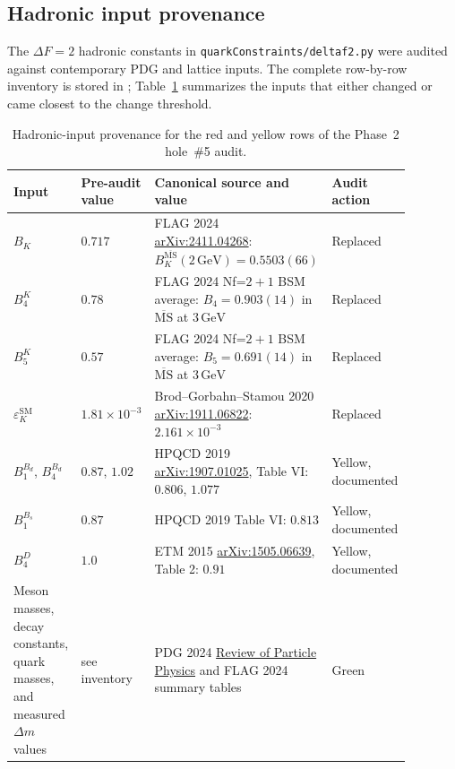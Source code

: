 \documentclass[11pt]{article}
\newcommand{\msbar}{\overline{\mathrm{MS}}}
\newcommand{\eK}{\varepsilon_K}
\begin{document}
\subsection{Hadronic input provenance}
\label{app:hadronic-input-provenance}

The $\Delta F=2$ hadronic constants in
\texttt{quarkConstraints/deltaf2.py} were audited against contemporary
PDG and lattice inputs. The complete row-by-row inventory is stored in
; Table~\ref{tab:hadronic-provenance}
summarizes the inputs that either changed or came closest to the
change threshold.

\begin{table}[h]
  \centering
  \scriptsize
  \setlength{\tabcolsep}{3pt}
  \begin{tabular}{p{0.17\linewidth}p{0.16\linewidth}p{0.41\linewidth}p{0.14\linewidth}}
    \toprule
    Input & Pre-audit value & Canonical source and value & Audit action \\
    \midrule
    $B_K$ & $0.717$ & FLAG 2024
      \href{https://arxiv.org/abs/2411.04268}{arXiv:2411.04268}:
      $B_K^{\msbar}(2\,\mathrm{GeV})=0.5503(66)$ & Replaced \\
    $B_4^K$ & $0.78$ & FLAG 2024 Nf=$2+1$ BSM average:
      $B_4=0.903(14)$ in $\msbar$ at $3\,\mathrm{GeV}$ & Replaced \\
    $B_5^K$ & $0.57$ & FLAG 2024 Nf=$2+1$ BSM average:
      $B_5=0.691(14)$ in $\msbar$ at $3\,\mathrm{GeV}$ & Replaced \\
    $\eK^{\mathrm{SM}}$ & $1.81\times10^{-3}$ & Brod--Gorbahn--Stamou 2020
      \href{https://arxiv.org/abs/1911.06822}{arXiv:1911.06822}:
      $2.161\times10^{-3}$ & Replaced \\
    $B_1^{B_d}$, $B_4^{B_d}$ & $0.87$, $1.02$ & HPQCD 2019
      \href{https://arxiv.org/abs/1907.01025}{arXiv:1907.01025},
      Table VI: $0.806$, $1.077$ & Yellow, documented \\
    $B_1^{B_s}$ & $0.87$ & HPQCD 2019 Table VI: $0.813$ & Yellow, documented \\
    $B_4^D$ & $1.0$ & ETM 2015
      \href{https://arxiv.org/abs/1505.06639}{arXiv:1505.06639},
      Table 2: $0.91$ & Yellow, documented \\
    Meson masses, decay constants, quark masses, and measured
      $\Delta m$ values & see inventory & PDG 2024
      \href{https://pdg.lbl.gov/2024/}{Review of Particle Physics}
      and FLAG 2024 summary tables & Green \\
    \bottomrule
  \end{tabular}
  \caption{Hadronic-input provenance for the red and yellow rows of the
  Phase~2 hole~\#5 audit.}
  \label{tab:hadronic-provenance}
\end{table}
\end{document}
